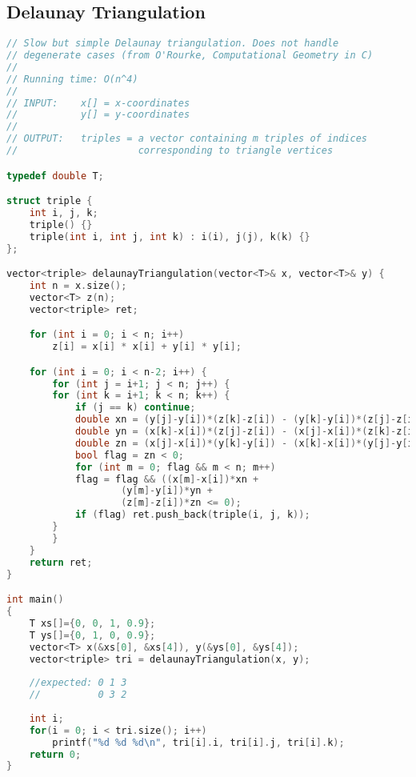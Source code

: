 \subsection{Delaunay Triangulation}
\begin{lstlisting}[language=C++]
// Slow but simple Delaunay triangulation. Does not handle
// degenerate cases (from O'Rourke, Computational Geometry in C)
//
// Running time: O(n^4)
//
// INPUT:    x[] = x-coordinates
//           y[] = y-coordinates
//
// OUTPUT:   triples = a vector containing m triples of indices
//                     corresponding to triangle vertices

typedef double T;

struct triple {
    int i, j, k;
    triple() {}
    triple(int i, int j, int k) : i(i), j(j), k(k) {}
};

vector<triple> delaunayTriangulation(vector<T>& x, vector<T>& y) {
	int n = x.size();
	vector<T> z(n);
	vector<triple> ret;

	for (int i = 0; i < n; i++)
	    z[i] = x[i] * x[i] + y[i] * y[i];

	for (int i = 0; i < n-2; i++) {
	    for (int j = i+1; j < n; j++) {
		for (int k = i+1; k < n; k++) {
		    if (j == k) continue;
		    double xn = (y[j]-y[i])*(z[k]-z[i]) - (y[k]-y[i])*(z[j]-z[i]);
		    double yn = (x[k]-x[i])*(z[j]-z[i]) - (x[j]-x[i])*(z[k]-z[i]);
		    double zn = (x[j]-x[i])*(y[k]-y[i]) - (x[k]-x[i])*(y[j]-y[i]);
		    bool flag = zn < 0;
		    for (int m = 0; flag && m < n; m++)
			flag = flag && ((x[m]-x[i])*xn + 
					(y[m]-y[i])*yn + 
					(z[m]-z[i])*zn <= 0);
		    if (flag) ret.push_back(triple(i, j, k));
		}
	    }
	}
	return ret;
}

int main()
{
    T xs[]={0, 0, 1, 0.9};
    T ys[]={0, 1, 0, 0.9};
    vector<T> x(&xs[0], &xs[4]), y(&ys[0], &ys[4]);
    vector<triple> tri = delaunayTriangulation(x, y);
    
    //expected: 0 1 3
    //          0 3 2
    
    int i;
    for(i = 0; i < tri.size(); i++)
        printf("%d %d %d\n", tri[i].i, tri[i].j, tri[i].k);
    return 0;
}
\end{lstlisting}